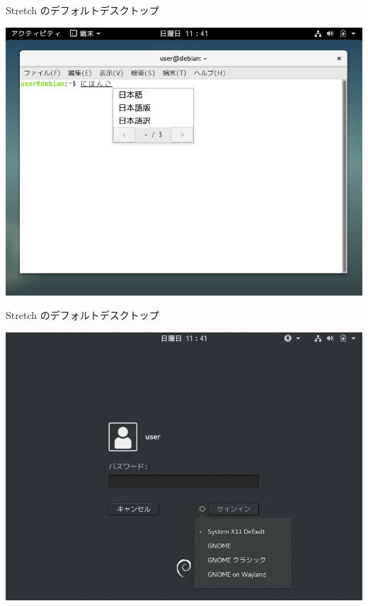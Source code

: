\begin{frame}{Stretch のデフォルトデスクトップ}

\begin{center}
\includegraphics[keepaspectratio,width=1\hsize]{image201907/stretch_gnome_3.png}
\end{center}

\end{frame}

\begin{frame}{Stretch のデフォルトデスクトップ}

\begin{center}
\includegraphics[keepaspectratio,width=1\hsize]{image201907/stretch_gnome_0.png}
\end{center}

\end{frame}


